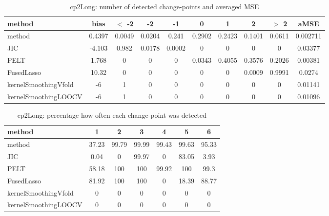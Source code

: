 \begin{table}[ht]
\centering
\begin{tabular}{l|c|ccccccc|c}
  \hline
method & bias & $<$ -2 & -2 & -1 & 0 & 1 & 2 & $>$ 2 & aMSE \\ 
  \hline
method & 0.4397 & 0.0049 & 0.0204 & 0.241 & 0.2902 & 0.2423 & 0.1401 & 0.0611 & 0.002711 \\ 
  JIC & -4.103 & 0.982 & 0.0178 & 0.0002 &     0 &     0 &     0 &     0 & 0.03377 \\ 
  PELT & 1.768 &     0 &     0 &     0 & 0.0343 & 0.4055 & 0.3576 & 0.2026 & 0.00381 \\ 
  FusedLasso & 10.32 &     0 &     0 &     0 &     0 &     0 & 0.0009 & 0.9991 & 0.0274 \\ 
  kernelSmoothingVfold &    -6 &     1 &     0 &     0 &     0 &     0 &     0 &     0 & 0.01141 \\ 
  kernelSmoothingLOOCV &    -6 &     1 &     0 &     0 &     0 &     0 &     0 &     0 & 0.01096 \\ 
   \hline
\end{tabular}
\caption{cp2Long: number of detected change-points and averaged MSE} 
\label{tab:cp2LongNjumps}
\end{table}
\begin{table}[ht]
\centering
\begin{tabular}{l|cccccc}
  \hline
method & 1 & 2 & 3 & 4 & 5 & 6 \\ 
  \hline
method &  37.23 &  99.79 &  99.99 &  99.43 &  99.63 &  95.33 \\ 
  JIC &   0.04 &      0 &  99.97 &      0 &  83.05 &   3.93 \\ 
  PELT &  58.18 &    100 &    100 &  99.92 &    100 &   99.3 \\ 
  FusedLasso &  81.92 &    100 &    100 &      0 &  18.39 &  88.77 \\ 
  kernelSmoothingVfold &      0 &      0 &      0 &      0 &      0 &      0 \\ 
  kernelSmoothingLOOCV &      0 &      0 &      0 &      0 &      0 &      0 \\ 
   \hline
\end{tabular}
\caption{cp2Long: percentage how often each change-point was detected} 
\label{tab:cp2LongDetections}
\end{table}
